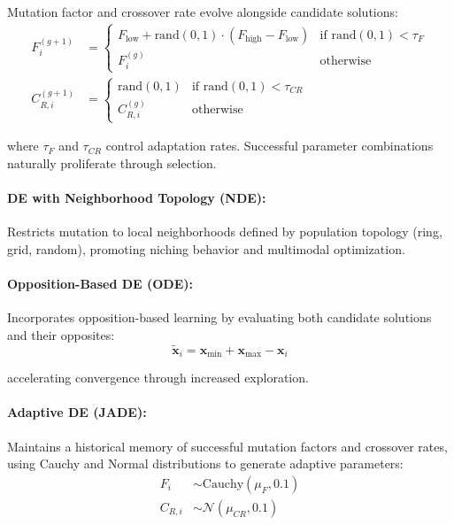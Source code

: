 \documentclass[12pt,a4paper]{report}
\begin{document}
Mutation factor and crossover rate evolve alongside candidate solutions:
\begin{align}
F_i^{(g+1)} &= \begin{cases}
F_{\text{low}} + \text{rand}(0,1) \cdot (F_{\text{high}} - F_{\text{low}}) & \text{if } \text{rand}(0,1) < \tau_F \\
F_i^{(g)} & \text{otherwise}
\end{cases} \\
C_{R,i}^{(g+1)} &= \begin{cases}
\text{rand}(0,1) & \text{if } \text{rand}(0,1) < \tau_{CR} \\
C_{R,i}^{(g)} & \text{otherwise}
\end{cases}
\end{align}

where $\tau_F$ and $\tau_{CR}$ control adaptation rates. Successful parameter combinations naturally proliferate through selection.

\paragraph{DE with Neighborhood Topology (NDE):}

Restricts mutation to local neighborhoods defined by population topology (ring, grid, random), promoting niching behavior and multimodal optimization.

\paragraph{Opposition-Based DE (ODE):}

Incorporates opposition-based learning by evaluating both candidate solutions and their opposites:
\begin{equation}
\tilde{\mathbf{x}}_i = \mathbf{x}_{\text{min}} + \mathbf{x}_{\text{max}} - \mathbf{x}_i
\end{equation}

accelerating convergence through increased exploration.

\paragraph{Adaptive DE (JADE):}

Maintains a historical memory of successful mutation factors and crossover rates, using Cauchy and Normal distributions to generate adaptive parameters:
\begin{align}
F_i &\sim \text{Cauchy}(\mu_F, 0.1) \\
C_{R,i} &\sim \mathcal{N}(\mu_{CR}, 0.1)
\end{align}
\end{document}
